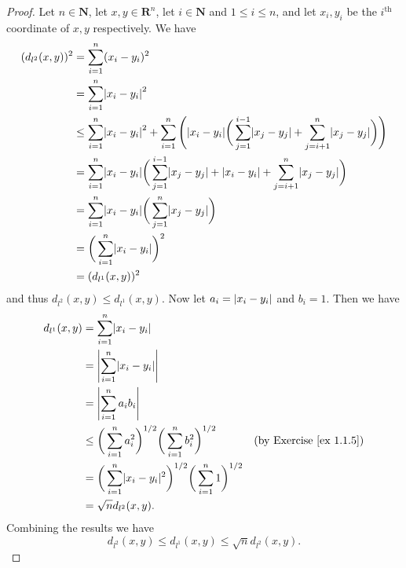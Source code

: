 \begin{proof}
    Let \(n \in \mathbf{N}\), let \(x, y \in \mathbf{R}^n\), let \(i \in \mathbf{N}\) and \(1 \leq i \leq n\), and let \(x_i, y_i\) be the \(i^{\text{th}}\) coordinate of \(x, y\) respectively.
    We have
    \begin{align*}
        (d_{l^2}(x, y))^2 & = \sum_{i = 1}^n (x_i - y_i)^2                                                                                                                                               \\
                          & = \sum_{i = 1}^n \abs*{x_i - y_i}^2                                                                                                                                          \\
                          & \leq \sum_{i = 1}^n \abs*{x_i - y_i}^2 + \sum_{i = 1}^n \Bigg(\abs*{x_i - y_i} \bigg(\sum_{j = 1}^{i - 1} \abs*{x_j - y_j} + \sum_{j = i + 1}^n \abs*{x_j - y_j}\bigg)\Bigg) \\
                          & = \sum_{i = 1}^n \abs*{x_i - y_i} \bigg(\sum_{j = 1}^{i - 1} \abs*{x_j - y_j} + \abs*{x_i - y_i} + \sum_{j = i + 1}^n \abs*{x_j - y_j}\bigg)                                 \\
                          & = \sum_{i = 1}^n \abs*{x_i - y_i} \bigg(\sum_{j = 1}^n \abs*{x_j - y_j}\bigg)                                                                                                \\
                          & = \bigg(\sum_{i = 1}^n \abs*{x_i - y_i}\bigg)^2                                                                                                                              \\
                          & = (d_{l^1}(x, y))^2
    \end{align*}
    and thus \(d_{l^2}(x, y) \leq d_{l^1}(x, y)\).
    Now let \(a_i = \abs*{x_i - y_i}\) and \(b_i = 1\).
    Then we have
    \begin{align*}
        d_{l^1}(x, y) & = \sum_{i = 1}^n \abs*{x_i - y_i}                                                                                                 \\
                      & = \abs*{\sum_{i = 1}^n \abs*{x_i - y_i}}                                                                                          \\
                      & = \abs*{\sum_{i = 1}^n a_i b_i}                                                                                                   \\
                      & \leq \bigg(\sum_{i = 1}^n a_i^2\bigg)^{1 / 2} \bigg(\sum_{i = 1}^n b_i^2\bigg)^{1 / 2}      & \text{(by Exercise \ref{ex 1.1.5})} \\
                      & = \bigg(\sum_{i = 1}^n \abs{x_i - y_i}^2\bigg)^{1 / 2} \bigg(\sum_{i = 1}^n 1\bigg)^{1 / 2}                                       \\
                      & = \sqrt{n} d_{l^2}(x, y).
    \end{align*}
    Combining the results we have
    \[
        d_{l^2}(x, y) \leq d_{l^1}(x, y) \leq \sqrt{n} d_{l^2}(x, y).
    \]
\end{proof}

